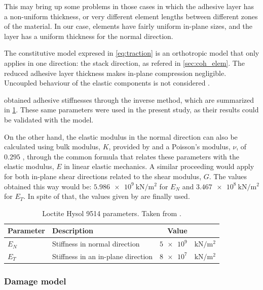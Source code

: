 \documentclass[
documentsize = a4, %
font = cmr, %
typesize = 11, %
printmode = true,
onehalfspacing = true,
language = en, %
titlepage = udciccp, %
degree = pt, %
dedication = true,
acknowledgements = true,
abstract-en = true,
abstract-es = false,
abstract-ga = false,
epigraphs = true,
toc = true,
lof = true,
lot = true,
frontmatterintoc = false,
notation = false,
minimal = false,
]{UDCthesis}
\begin{document}
This may bring up some problems in those cases in which the adhesive layer has a non-uniform thickness, or very different element lengths between different zones of the material. In our case, elements have fairly uniform in-plane sizes, and the layer has a uniform thickness for the normal direction.

The constitutive model expresed in \cref{eq:traction} is an orthotropic model that only applies in one direction: the stack direction, as refered in \cref{sec:coh_elem}. The reduced adhesive layer thickness makes in-plane compression negligible. Uncoupled behaviour of the elastic components is not considered \citep{Scattina2011}.

\citet{Scattina2011} obtained adhesive stiffnesses through the inverse method, which are summarized in \cref{tab:ads_params}. These same parameters were used in the present study, as their results could be validated with the model.

On the other hand, the elastic modulus in the normal direction can also be calculated using bulk modulus, $K$, provided by \citet{manufCatalog} and a Poisson's modulus, $\nu$, of $\num{0.295}$ \citep{JDiaz}, through the common formula that relates these parameters with the elastic modulus, $E$ in linear elastic mechanics. A similar proceeding would apply for both in-plane shear directions related to the shear modulus, $G$. The values obtained this way would be: $\SI{5.986e9}{\kN/\m^2}$ for $E_{N}$ and $\SI{3.467e8}{\kN/\m^2}$ for $E_{T}$. In spite of that, the values given by \citet{Scattina2011} are finally used.

\begin{table}
	\centering
	\begin{tabular}{llrl}
		\toprule
		Parameter & Description & Value & \\
		\midrule
		$E_{N}$ & Stiffness in normal direction & $\num{5e9}$ & $\si{\kN/\m^2}$ \\
		$E_{T}$ & Stiffness in an in-plane direction & $\num{8e7}$ & $\si{\kN/\m^2}$ \\
		\bottomrule
	\end{tabular}
	\caption[Loctite Hysol 9514 parameters.]{Loctite Hysol 9514 parameters. Taken from \citet{Scattina2011}.}
	\label{tab:ads_params}
\end{table}

\subsubsection{Damage model}
\label{sec:damage}
\end{document}
